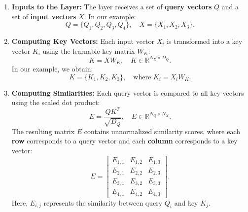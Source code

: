 \begin{enumerate}
    \item \textbf{Inputs to the Layer:} The layer receives a set of \textbf{query vectors} \( Q \) and a set of \textbf{input vectors} \( X \). In our example:
    \begin{equation}
        Q = \{Q_1, Q_2, Q_3, Q_4\}, \quad X = \{X_1, X_2, X_3\}.
    \end{equation}
    
    \item \textbf{Computing Key Vectors:} Each input vector \( X_i \) is transformed into a key vector \( K_i \) using the learnable key matrix \( W_K \):
    \begin{equation}
        K = X W_K, \quad K \in \mathbb{R}^{N_X \times D_Q}.
    \end{equation}
    In our example, we obtain:
    \begin{equation}
        K = \{K_1, K_2, K_3\}, \quad \text{where } K_i = X_i W_K.
    \end{equation}
    
    \item \textbf{Computing Similarities:} Each query vector is compared to all key vectors using the scaled dot product:
    \begin{equation}
        E = \frac{QK^T}{\sqrt{D_Q}}, \quad E \in \mathbb{R}^{N_Q \times N_X}.
    \end{equation}
    The resulting matrix \( E \) contains unnormalized similarity scores, where each \textbf{row} corresponds to a query vector and each \textbf{column} corresponds to a key vector:
    \begin{equation}
        E =
        \begin{bmatrix}
            E_{1,1} & E_{1,2} & E_{1,3} \\
            E_{2,1} & E_{2,2} & E_{2,3} \\
            E_{3,1} & E_{3,2} & E_{3,3} \\
            E_{4,1} & E_{4,2} & E_{4,3}
        \end{bmatrix}.
    \end{equation}
    Here, \( E_{i,j} \) represents the similarity between query \( Q_i \) and key \( K_j \). 
    

\end{enumerate}
